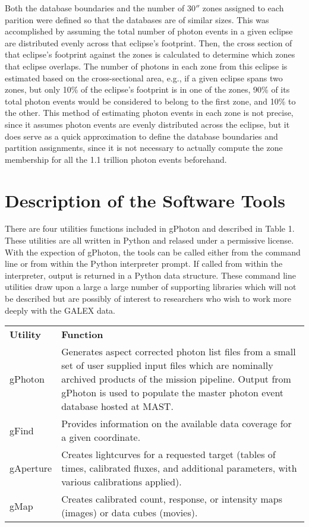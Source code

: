 \documentclass[preprint]{aastex}
\begin{document}
Both the database boundaries and the number of $30''$ zones assigned to each parition were defined so that the databases are of similar sizes.  This was accomplished by assuming the total number of photon events in a given eclipse are distributed evenly across that eclipse's footprint.  Then, the cross section of that eclipse's footprint against the zones is calculated to determine which zones that eclipse overlaps.  The number of photons in each zone from this eclipse is estimated based on the cross-sectional area, e.g., if a given eclipse spans two zones, but only 10\% of the eclipse's footprint is in one of the zones, 90\% of its total photon events would be considered to belong to the first zone, and 10\% to the other.  This method of estimating photon events in each zone is not precise, since it assumes photon events are evenly distributed across the eclipse, but it does serve as a quick approximation to define the database boundaries and partition assignments, since it is not necessary to actually compute the zone membership for all the 1.1 trillion photon events beforehand.

\section{Description of the Software Tools}
\label{softwaretools}
There are four utilities functions included in gPhoton and described in {\color{red}Table 1}. These utilities are all written in Python and relased under a permissive license. With the expection of gPhoton, the tools can be called either from the command line or from within the Python interpreter prompt. If called from within the interpreter, output is returned in a Python data structure. These command line utilities draw upon a large a large number of supporting libraries which will not be described but are possibly of interest to researchers who wish to work more deeply with the GALEX data.

\begin{tabular}{|p{2cm}|p{12cm}|}
\hline
	{\bf Utility} & {\bf Function}\\
	gPhoton & {Generates aspect corrected photon list files from a small set of user supplied input files which are nominally archived products of the mission pipeline. Output from gPhoton is used to populate the master photon event database hosted at MAST.}\\
	gFind & Provides information on the available data coverage for a given coordinate.\\
	gAperture & Creates lightcurves for a requested target (tables of times, calibrated fluxes, and additional parameters, with various calibrations applied).\\
	gMap & Creates calibrated count, response, or intensity maps (images) or data cubes (movies).\\
\hline
\end{tabular}
\end{document}
